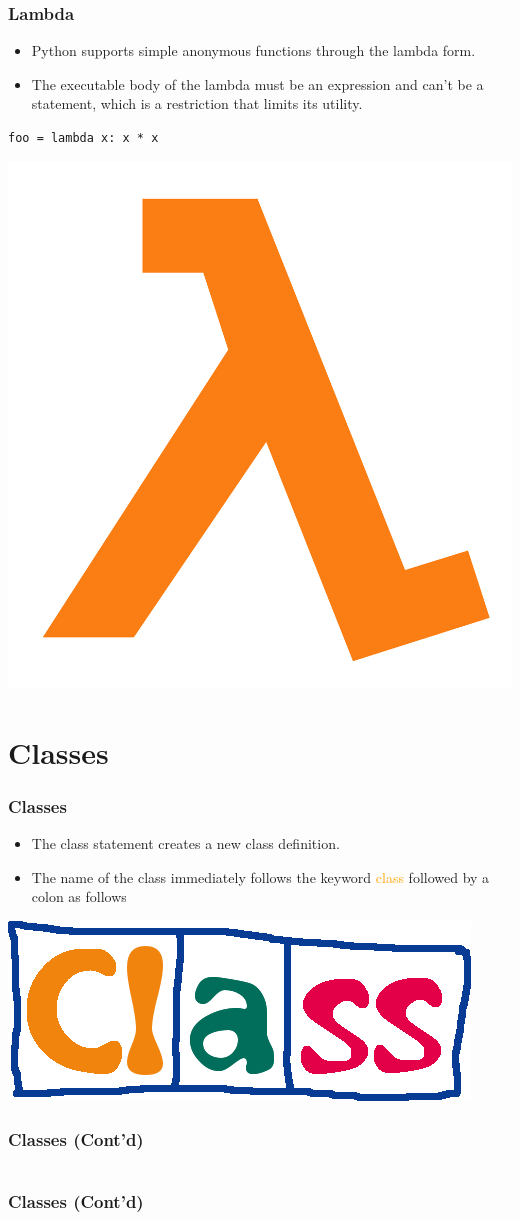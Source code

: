 \documentclass{../py-lecture}
\begin{document}
\begin{frame}[fragile]
	\frametitle{Lambda}
  \begin{itemize}
    \item Python supports simple anonymous functions through the lambda form.
    \item The executable body of the lambda must be an expression
    and can't be a statement, which is a restriction that limits its utility.
  \end{itemize}
  \begin{verbatim}
foo = lambda x: x * x
  \end{verbatim}
	\centering \includegraphics[width=.3\textwidth]{img/lambda.png}
\end{frame}

\section{Classes}

\begin{frame}
	\frametitle{Classes}
  \begin{itemize}
    \item The class statement creates a new class definition.
    \item The name of the class immediately follows the keyword \textcolor{Orange}{class}
    followed by a colon as follows
  \end{itemize}
	\centering \includegraphics[width=.3\textwidth]{img/class.jpg}
\end{frame}

\begin{frame}[fragile]
	\frametitle{Classes (Cont'd)}
  \inputminted[bgcolor=Black,fontsize=\scriptsize,lastline=18]{python}{./src/employee.py}
\end{frame}

\begin{frame}[fragile]
	\frametitle{Classes (Cont'd)}
  \inputminted[bgcolor=Black,fontsize=\scriptsize,firstline=19]{python}{./src/employee.py}
\end{frame}
\end{document}
